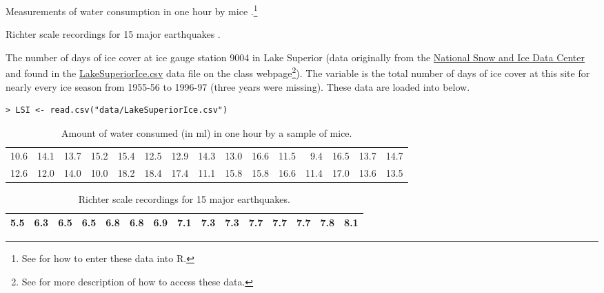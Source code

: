 \documentclass[10pt,openany]{book}\usepackage[]{graphicx}\usepackage[]{color}
\makeatletter
\newenvironment{kframe}{%
 \def\at@end@of@kframe{}%
 \ifinner\ifhmode%
  \def\at@end@of@kframe{\end{minipage}}%
  \begin{minipage}{\columnwidth}%
 \fi\fi%
 \def\FrameCommand##1{\hskip\@totalleftmargin \hskip-\fboxsep
 \colorbox{shadecolor}{##1}\hskip-\fboxsep
     \hskip-\linewidth \hskip-\@totalleftmargin \hskip\columnwidth}%
 \MakeFramed {\advance\hsize-\width
   \@totalleftmargin\z@ \linewidth\hsize
   \@setminipage}}%
 {\par\unskip\endMakeFramed%
 \at@end@of@kframe}
\newenvironment{knitrout}{}{} %
\makeatother
\begin{document}
\vspace{-12pt}
\begin{Itemize}
  \item Measurements of water consumption in one hour by mice .\footnote{See  for how to enter these data into R.}
  \item Richter scale recordings for 15 major earthquakes .
  \item The number of days of ice cover at ice gauge station 9004 in Lake Superior (data originally from the \href{http://www.nsidc.org/}{National Snow and Ice Data Center} and found in the \href{https://raw.githubusercontent.com/droglenc/NCData/master/LakeSuperiorIce.csv}{LakeSuperiorIce.csv} data file on the class webpage\footnote{See  for more description of how to access these data.}).  The  variable is the total number of days of ice cover at this site for nearly every ice season from 1955-56 to 1996-97 (three years were missing).  These data are loaded into  below.
\vspace{-6pt}
\begin{knitrout}
\color{fgcolor}\begin{kframe}
\begin{verbatim}
> LSI <- read.csv("data/LakeSuperiorIce.csv")
\end{verbatim}
\end{kframe}
\end{knitrout}
\end{Itemize}

\begin{table}[ht]
\centering
\caption{Amount of water consumed (in ml) in one hour by a sample of mice.} 
\label{tab:MouseData}
\begin{tabular}{rrrrrrrrrrrrrrr}
   \hline
10.6 & 14.1 & 13.7 & 15.2 & 15.4 & 12.5 & 12.9 & 14.3 & 13.0 & 16.6 & 11.5 & 9.4 & 16.5 & 13.7 & 14.7 \\ 
  12.6 & 12.0 & 14.0 & 10.0 & 18.2 & 18.4 & 17.4 & 11.1 & 15.8 & 15.8 & 16.6 & 11.4 & 17.0 & 13.6 & 13.5 \\ 
   \hline
\end{tabular}
\end{table}


\begin{table}[ht]
\centering
\caption{Richter scale recordings for 15 major earthquakes.} 
\label{tab:EQData}
\begin{tabular}{rrrrrrrrrrrrrrr}
   \hline
5.5 & 6.3 & 6.5 & 6.5 & 6.8 & 6.8 & 6.9 & 7.1 & 7.3 & 7.3 & 7.7 & 7.7 & 7.7 & 7.8 & 8.1 \\ 
   \hline
\end{tabular}
\end{table}
\end{document}
